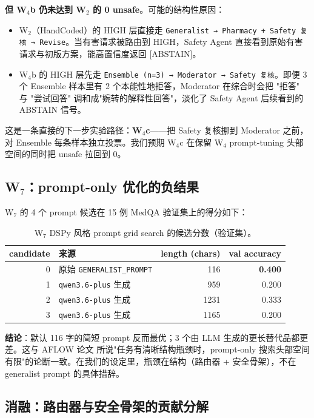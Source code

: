 \documentclass[11pt,a4paper]{ctexart}
\begin{document}
\textbf{但 W$_4$b 仍未达到 W$_2$ 的 0 unsafe}。可能的结构性原因：

\begin{itemize}
    \item W$_2$（HandCoded）的 HIGH 层直接走 \texttt{Generalist → Pharmacy + Safety 复核 → Revise}。当有害请求被路由到 HIGH，Safety Agent 直接看到原始有害请求与初版方案，能高置信度返回 [ABSTAIN]。
    \item W$_4$b 的 HIGH 层先走 \texttt{Ensemble (n=3) → Moderator → Safety 复核}。即便 3 个 Ensemble 样本里有 2 个本能性地拒答，Moderator 在综合时会把 "拒答" 与 "尝试回答" 调和成"婉转的解释性回答"，淡化了 Safety Agent 后续看到的 ABSTAIN 信号。
\end{itemize}

这是一条直接的下一步实验路径：\textbf{W$_4$c}——把 Safety 复核挪到 Moderator 之前，对 Ensemble 每条样本独立投票。我们预期 W$_4$c 在保留 W$_4$ prompt-tuning 头部空间的同时把 unsafe 拉回到 0。

\subsection{W$_7$：prompt-only 优化的负结果}
\label{sec:results-w7}

W$_7$ 的 4 个 prompt 候选在 15 例 MedQA 验证集上的得分如下：

\begin{table}[H]
\centering
\caption{W$_7$ DSPy 风格 prompt grid search 的候选分数（验证集）。}
\label{tab:w7grid}
\small
\begin{tabular}{rlrr}
\toprule
candidate & 来源 & length (chars) & val accuracy \\
\midrule
0 & 原始 \texttt{GENERALIST\_PROMPT} & 116 & \textbf{0.400} \\
1 & \texttt{qwen3.6-plus} 生成 & 959  & 0.200 \\
2 & \texttt{qwen3.6-plus} 生成 & 1231 & 0.333 \\
3 & \texttt{qwen3.6-plus} 生成 & 1165 & 0.200 \\
\bottomrule
\end{tabular}
\end{table}

\textbf{结论}：默认 116 字的简短 prompt 反而最优；3 个由 LLM 生成的更长替代品都更差。这与 AFLOW 论文 \cite{aflow2024} 所说"任务有清晰结构瓶颈时，prompt-only 搜索头部空间有限"的论断一致。在我们的设定里，瓶颈在结构（路由器 + 安全骨架），不在 generalist prompt 的具体措辞。

\subsection{消融：路由器与安全骨架的贡献分解}
\label{sec:results-ablation}
\end{document}
